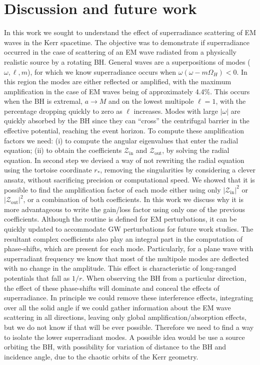 
\chapter{Discussion and future work} %
\label{Chapter6}

In this work we sought to understand the effect of superradiance scattering of EM waves in the Kerr spacetime.
The objective was to demonstrate if superradiance occurred in the case of scattering of an EM wave radiated from a physically realistic source by a rotating BH.
General waves are a superpositions of modes ($\omega, \ell, m$), for which we know superradiance occurs when $\omega(\omega - m \Omega_H)<0$.
In this region the modes are either reflected or amplified, with the maximum amplification in the case of EM waves being of approximately 4.4\%.
This occurs when the BH is extremal, $a\to M$ and on the lowest multipole $\ell=1$, with the percentage dropping quickly to zero as $\ell$ increases.
Modes with large $|\omega|$ are quickly absorbed by the BH since they can ``cross'' the centrifugal barrier in the effective potential, reaching the event horizon.
To compute these amplification factors we need: (i) to compute the angular eigenvalues that enter the radial equation; (ii) to obtain the coefficients $\mathscr{Z}_\mathrm{in}$ and $\mathscr{Z}_\mathrm{out}$, by solving the radial equation.
In second step we devised a way of not rewriting the radial equation using the tortoise coordinate $r_*$, removing the singularities by considering a clever ansatz, without sacrificing precision or computational speed.
We showed that it is possible to find the amplification factor of each mode either using only $|\mathscr{Z}_\mathrm{in}|^2$ or $|\mathscr{Z}_\mathrm{out}|^2$, or a combination of both coefficients.
In this work we discuss why it is more advantageous to write the gain/loss factor using only one of the previous coefficients.
Although the routine is defined for EM perturbations, it can be quickly updated to accommodate GW perturbations for future work studies.
The resultant complex coefficients also play an integral part in the computation of phase-shifts, which are present for each mode.
Particularly, for a plane wave with superradiant frequency we know that most of the multipole modes are deflected with no change in the amplitude.
This effect is characteristic of long-ranged potentials that fall as $1/r$.
When observing the BH from a particular direction, the effect of these phase-shifts will dominate and conceal the effects of superradiance.
In principle we could remove these interference effects, integrating over all the solid angle if we could gather information about the EM wave scattering in all directions, leaving only global amplification/absorption effects, but we do not know if that will be ever possible.
Therefore we need to find a way to isolate the lower superradiant modes. A possible idea would be use a source orbiting the BH, with possibility for variation of distance to the BH and incidence angle, due to the chaotic orbits of the Kerr geometry.

